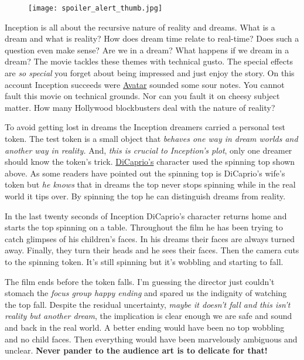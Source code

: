 \begin{figure}[htbp]
\centering
\texttt{[image: spoiler\_alert\_thumb.jpg]}
\label{fig:696X1}
\end{figure}


Inception is all about the recursive nature of reality and dreams. What is a
dream and what is reality? How does dream time relate to real-time? Does
such a question even make sense? Are we in a dream? What happens if we
dream in a dream? The movie tackles these themes with technical gusto.
The special effects are \emph{so special} you forget about being
impressed and just enjoy the story. On this account Inception succeeds
were \href{http://www.avatarmovie.com/}{Avatar} sounded some sour notes.
You cannot fault this movie on technical grounds. Nor can you fault it
on cheesy subject matter. How many Hollywood blockbusters deal with the
nature of reality?

To avoid getting lost in dreams the Inception dreamers carried a
personal test token. The test token is a small object that \emph{behaves
one way in dream worlds and another way in reality.} And, \emph{this is
crucial to Inception's plot}, only one dreamer should know the token's
trick.
\href{http://en.wikipedia.org/wiki/Leonardo\_DiCaprio}{DiCaprio's}
character used the spinning top shown above. As some readers have
pointed out the spinning top is DiCaprio's wife's token but \emph{he
knows} that in dreams the top never stops spinning while in the real
world it tips over. By spinning the top he can distinguish dreams from
reality.

In the last twenty seconds of Inception DiCaprio's character returns
home and starts the top spinning on a table. Throughout the film he has
been trying to catch glimpses of his children's faces. In his dreams
their faces are always turned away. Finally, they turn their heads and
he sees their faces. Then the camera cuts to the spinning token. It's
still spinning but it's wobbling and starting to fall.

The film ends before the token falls. I'm guessing the director just
couldn't stomach the \emph{focus group happy ending} and spared us the
indignity of watching the top fall. Despite the residual uncertainty,
\emph{maybe it doesn't fall and this isn't reality but another dream},
the implication is clear enough we are safe and sound and back in the
real world. A better ending would have been no top wobbling and no child
faces. Then everything would have been marvelously ambiguous and
unclear. \textbf{Never pander to the audience art is to delicate for
that!}

